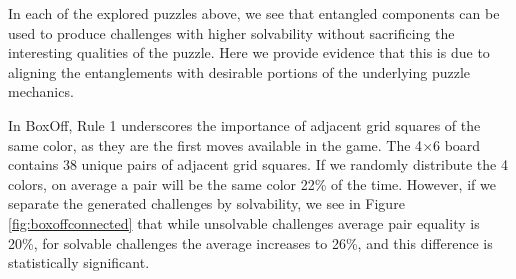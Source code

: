 \documentclass[journal]{IEEEtran}
\begin{document}


In each of the explored puzzles above, we see that entangled components can be used to produce challenges with higher solvability without sacrificing the interesting qualities of the puzzle. Here we provide evidence that this is due to aligning the entanglements with desirable portions of the underlying puzzle mechanics. 


In BoxOff, Rule 1 underscores the importance of adjacent grid squares of the same color, as they are the first moves available in the game. The 4$\times$6 board contains 38 unique pairs of adjacent grid squares. If we randomly distribute the 4 colors, on average a pair will be the same color 22\% of the time. However, if we separate the generated challenges by solvability, we see in Figure \ref{fig:boxoffconnected} that while unsolvable challenges average pair equality is 20\%, for solvable challenges the average increases to 26\%, and this difference is statistically significant.
\end{document}
